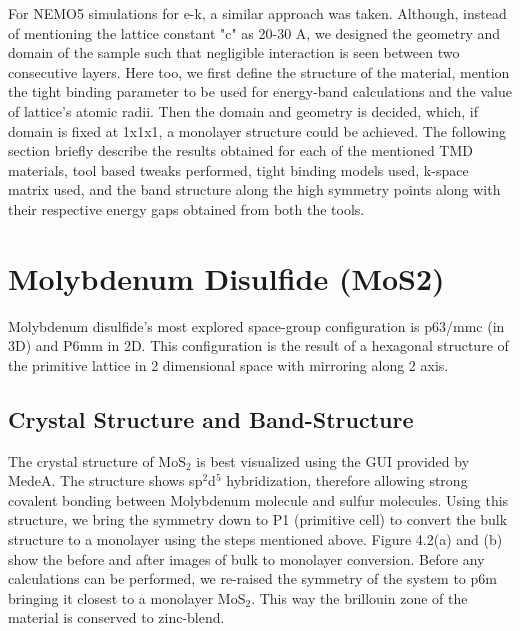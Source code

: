 \documentclass[microe]{ritthesis}
\begin{document}
For NEMO5 simulations for e-k, a similar approach was taken. Although, instead of mentioning the lattice constant "c" as 20-30 A, we designed the geometry and domain of the sample such that negligible interaction is seen between two consecutive layers. Here too, we first define the structure of the material, mention the tight binding parameter to be used for energy-band calculations and the value of lattice's atomic radii. Then the domain and geometry is decided, which, if domain is fixed at 1x1x1, a monolayer structure could be achieved.
The following section briefly describe the results obtained for each of the mentioned TMD materials, tool based tweaks performed, tight binding models used, k-space matrix used, and the band structure along the high symmetry points along with their respective energy gaps obtained from both the tools. 
\section{Molybdenum Disulfide (MoS2)}
Molybdenum disulfide's most explored space-group configuration is p63/mmc (in 3D) and P6mm in 2D. This configuration is the result of a hexagonal structure of the primitive lattice in 2 dimensional space with mirroring along 2 axis. 
\subsection{Crystal Structure and Band-Structure}
The crystal structure of MoS$_2$ is best visualized using the GUI provided by MedeA. The structure shows sp$^2$d$^5$ hybridization, therefore allowing strong covalent bonding between Molybdenum molecule and sulfur molecules. 
Using this structure, we bring the symmetry down to P1 (primitive cell) to convert the bulk structure to a monolayer using the steps mentioned above. Figure 4.2(a) and (b) show the before and after images of bulk to monolayer conversion. Before any calculations can be performed, we re-raised the symmetry of the system to p6m bringing it closest to a monolayer MoS$_2$. This way the brillouin zone of the material is conserved to zinc-blend. 
\end{document}

